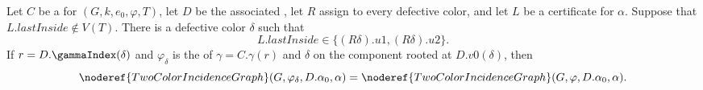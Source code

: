 \begin{helper}
Let $C$ be a  for
$(G,k,e_0,\varphi,T)$, let $D$ be the associated
, let $R$ assign
 to every defective color, and let $L$ be
a  certificate for $\alpha$.  Suppose that
$L.\mathit{lastInside}\notin V(T)$.  There is a defective color $\delta$
such that
\[
 L.\mathit{lastInside}\in\{(R\delta).u1,(R\delta).u2\}.
\]
If $r=D.\gammaIndex(\delta)$ and
$\varphi_\delta$ is the
 of $\gamma=C.\gamma(r)$ and $\delta$ on
the component rooted at $D.v0(\delta)$, then
\[
 \noderef{TwoColorIncidenceGraph}(G,\varphi_\delta,D.\alpha_0,\alpha)
 =\noderef{TwoColorIncidenceGraph}(G,\varphi,D.\alpha_0,\alpha).
\]
\end{helper}
